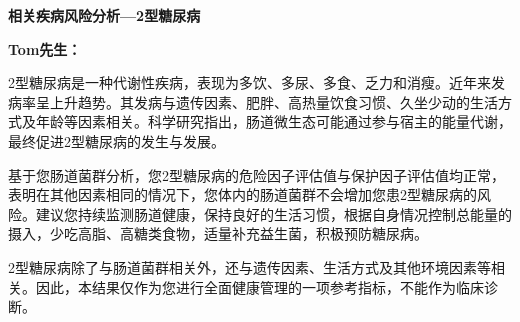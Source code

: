 

\usepackage{graphicx}
\graphicspath{{cores/}}




\setlength{\arrayrulewidth}{0.5pt}
\fontsize{9.3pt}{17pt}\selectfont
\color{gray2}

\vspace*{0mm}
\begin{center}
{\bf\sanhao 相关疾病风险分析—2型糖尿病}
\end{center}

\medskip

\noindent
{\bf\xiaosihao Tom先生：}


\bigskip
2型糖尿病是一种代谢性疾病，表现为多饮、多尿、多食、乏力和消瘦。近年来发病率呈上升趋势。其发病与遗传因素、肥胖、高热量饮食习惯、久坐少动的生活方式及年龄等因素相关。科学研究指出，肠道微生态可能通过参与宿主的能量代谢，最终促进2型糖尿病的发生与发展。

基于您肠道菌群分析，您2型糖尿病的危险因子评估值与保护因子评估值均正常，表明在其他因素相同的情况下，您体内的肠道菌群不会增加您患2型糖尿病的风险。建议您持续监测肠道健康，保持良好的生活习惯，根据自身情况控制总能量的摄入，少吃高脂、高糖类食物，适量补充益生菌，积极预防糖尿病。

2型糖尿病除了与肠道菌群相关外，还与遗传因素、生活方式及其他环境因素等相关。因此，本结果仅作为您进行全面健康管理的一项参考指标，不能作为临床诊断。

